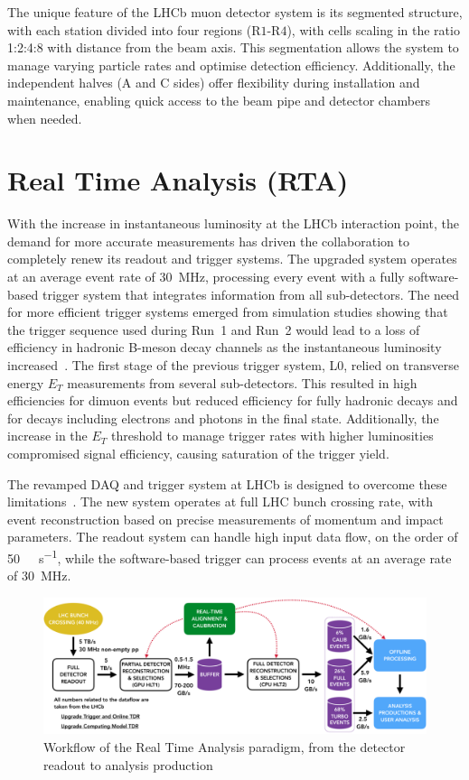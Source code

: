 The unique feature of the LHCb muon detector system is its segmented structure, with each station divided into four regions (R$1$-R$4$), with cells scaling in the ratio 1:2:4:8 with distance from the beam axis. This segmentation allows the system to manage varying particle rates and optimise detection efficiency. Additionally, the independent halves (A and C sides) offer flexibility during installation and maintenance, enabling quick access to the beam pipe and detector chambers when needed.


\section[Real Time Analysis]{Real Time Analysis (RTA)}\label{sec:rta}

With the increase in instantaneous luminosity at the LHCb interaction point, the demand for more accurate measurements has driven the collaboration to completely renew its readout and trigger systems. The upgraded system operates at an average event rate of \SI{30}{\mega\hertz}, processing every event with a fully software-based trigger system that integrates information from all sub-detectors. The need for more efficient trigger systems emerged from simulation studies showing that the trigger sequence used during Run~1 and Run~2 would lead to a loss of efficiency in hadronic B-meson decay channels as the instantaneous luminosity increased~\cite{CERN-LHCC-2011-001}. The first stage of the previous trigger system, L$0$, relied on transverse energy $E_T$ measurements from several sub-detectors. This resulted in high efficiencies for dimuon events but reduced efficiency for fully hadronic decays and for decays including electrons and photons in the final state. Additionally, the increase in the $E_T$ threshold to manage trigger rates with higher luminosities compromised signal efficiency, causing saturation of the trigger yield.

The revamped DAQ and trigger system at LHCb is designed to overcome these limitations~\cite{CERN-LHCC-2018-014}. The new system operates at full LHC bunch crossing rate, with event reconstruction based on precise measurements of momentum and impact parameters. The readout system can handle high input data flow, on the order of \SI[per-mode=symbol]{50}{\tera\byte\per\second}, while the software-based trigger can process events at an average rate of \SI{30}{\mega\hertz}. 

\begin{figure}
    \centering
    \includegraphics[width=\textwidth]{figures/hidef_RTA_dataflow_widescreen.png}
    \caption{Workflow of the Real Time Analysis paradigm, from the detector readout to analysis production}
    \label{fig:RTA}
\end{figure}

